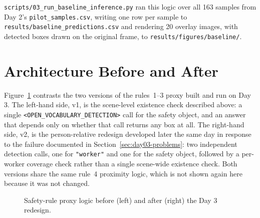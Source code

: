 \texttt{scripts/03\_run\_baseline\_inference.py} ran this logic over all 163 samples from Day 2's
\texttt{pilot\_samples.csv}, writing one row per sample to \texttt{results/baseline\_predictions.csv}
and rendering 20 overlay images, with detected boxes drawn on the original frame, to
\texttt{results/figures/baseline/}.

\section{Architecture Before and After}

Figure~\ref{fig:diagram-b} contrasts the two versions of the rules~1--3 proxy built and run on Day
3. The left-hand side, v1, is the scene-level existence check described above: a single
\texttt{<OPEN\_VOCABULARY\_DETECTION>} call for the safety object, and an answer that depends only on
whether that call returns any box at all. The right-hand side, v2, is the person-relative redesign
developed later the same day in response to the failure documented in
Section~\ref{sec:day03-problems}: two independent detection calls, one for \texttt{"worker"} and one
for the safety object, followed by a per-worker coverage check rather than a single scene-wide
existence check. Both versions share the same rule~4 proximity logic, which is not shown again here
because it was not changed.

\begin{figure}[h]
\centering
{}
\caption{Safety-rule proxy logic before (left) and after (right) the Day 3 redesign.}
\label{fig:diagram-b}
\end{figure}

